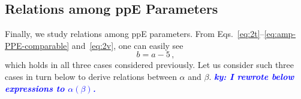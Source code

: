 \documentclass[prd,twocolumn,nofootinbib]{revtex4-1}
\newcommand{\ky}[1]{\textcolor{blue}{\it{\textbf{ky: #1}}} }
\begin{document}



\subsection{Relations among ppE Parameters}

Finally, we study relations among ppE parameters. From Eqs.~\eqref{eq:2t}--\eqref{eq:amp-PPE-comparable} and~\eqref{eq:2v}, one can easily see 
\begin{equation}
b=a-5\,,
\end{equation}
which holds in all three cases considered previously. Let us consider such three cases in turn below to derive relations between $\alpha$ and $\beta$. 
\ky{I rewrote below expressions to $\alpha(\beta)$.}
\end{document}
